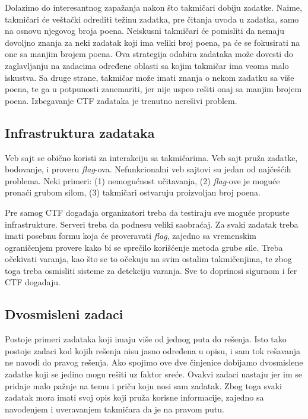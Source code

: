\documentclass[12pt, a4paper, twocolumn]{article}
\begin{document}
Dolazimo do interesantnog zapažanja nakon što takmičari dobiju zadatke.
Naime, takmičari će veštački odrediti težinu zadatka, pre čitanja uvoda u 
zadatka, samo na osnovu njegovog broja poena. Neiskusni takmičari će pomisliti
da nemaju dovoljno znanja za neki zadatak koji ima veliki broj poena, pa
će se fokusirati na one sa manjim brojem poena. Ova strategija odabira 
zadataka može dovesti do zaglavljanju na zadacima određene oblasti sa kojim
takmičar ima veoma malo iskustva. Sa druge strane, takmičar može imati
znanja o nekom zadatku sa više poena, te ga u potpunosti zanemariti, jer
nije uspeo rešiti onaj sa manjim brojem poena. Izbegavanje CTF zadataka
je trenutno nerešivi problem.

\subsection{Infrastruktura zadataka}

Veb sajt se obično koristi za interakciju sa takmičarima. Veb sajt pruža 
zadatke, bodovanje, i proveru \emph{flag}-ova. Nefunkcionalni veb sajtovi
su jedan od najčešćih problema. Neki primeri: (1) nemogućnost učitavanja,
(2) \emph{flag}-ove je moguće pronaći grubom silom, (3) takmičari ostvaruju 
proizvoljan broj poena.

Pre samog CTF događaja organizatori treba da testiraju sve moguće
propuste infrastrukture. Serveri treba da podnesu veliki saobraćaj.
Za svaki zadatak treba imati posebnu formu koja će proveravati \emph{flag},
zajedno sa vremenskim ograničenjem provere kako bi se sprečilo korišćenje
metoda grube sile. Treba očekivati varanja, kao što se to očekuju na svim 
ostalim takmičenjima, te zbog toga treba osmisliti sisteme za detekciju 
varanja. Sve to doprinosi sigurnom i fer CTF događaju.

\subsection{Dvosmisleni zadaci}

Postoje primeri zadataka koji imaju više od jednog puta do rešenja. Isto
tako postoje zadaci kod kojih rešenja nisu jasno određena u opisu, i
sam tok rešavanja ne navodi do pravog rešenja. Ako spojimo ove dve činjenice
dobijamo dvosmislene zadatke koji se jedino mogu rešiti uz faktor sreće.
Ovakvi zadaci nastaju jer im se pridaje malo pažnje na temu i priču koju 
nosi sam zadatak. Zbog toga svaki zadatak mora imati svoj opis koji pruža
korisne informacije, zajedno sa navođenjem i uveravanjem takmičara da je na 
pravom putu.
\end{document}
